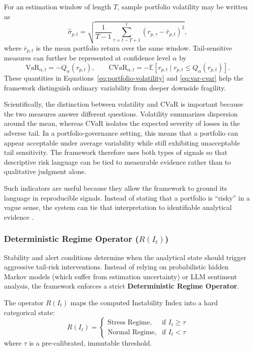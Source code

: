 \documentclass[11pt]{article}
\begin{document}
For an estimation window of length $T$, sample portfolio volatility may be written as
\begin{equation}
\label{eq:portfolio-volatility}
\hat{\sigma}_{p,t} = \sqrt{\frac{1}{T-1} \sum_{\tau=t-T+1}^{t} \left(r_{p,\tau} - \bar r_{p,t}\right)^2},
\end{equation}
where $\bar r_{p,t}$ is the mean portfolio return over the same window. Tail-sensitive measures can further be represented at confidence level $\alpha$ by
\begin{equation}
\label{eq:var-cvar}
\mathrm{VaR}_{\alpha,t} = -Q_{\alpha}(r_{p,t}),
\qquad
\mathrm{CVaR}_{\alpha,t} = -\mathbb{E}\left[r_{p,t} \mid r_{p,t} \le Q_{\alpha}(r_{p,t})\right].
\end{equation}
These quantities in Equations~\eqref{eq:portfolio-volatility} and \eqref{eq:var-cvar} help the framework distinguish ordinary variability from deeper downside fragility.

Scientifically, the distinction between volatility and CVaR is important because the two measures answer different questions. Volatility summarizes dispersion around the mean, whereas CVaR isolates the expected severity of losses in the adverse tail. In a portfolio-governance setting, this means that a portfolio can appear acceptable under average variability while still exhibiting unacceptable tail sensitivity. The framework therefore uses both types of signals so that descriptive risk language can be tied to measurable evidence rather than to qualitative judgment alone.

Such indicators are useful because they allow the framework to ground its language in reproducible signals. Instead of stating that a portfolio is ``risky'' in a vague sense, the system can tie that interpretation to identifiable analytical evidence \cite{adadi2018,arrieta2020}.

\subsubsection{Deterministic Regime Operator ($R(I_t)$)}
Stability and alert conditions determine when the analytical state should trigger aggressive tail-risk interventions. Instead of relying on probabilistic hidden Markov models (which suffer from estimation uncertainty) or LLM sentiment analysis, the framework enforces a strict \textbf{Deterministic Regime Operator}.

The operator $R(I_t)$ maps the computed Instability Index into a hard categorical state:
\begin{equation}
\label{eq:regime-operator}
R(I_t) = 
\begin{cases} 
\text{Stress Regime}, & \text{if } I_t \geq \tau \\
\text{Normal Regime}, & \text{if } I_t < \tau 
\end{cases}
\end{equation}
where $\tau$ is a pre-calibrated, immutable threshold. 
\end{document}
